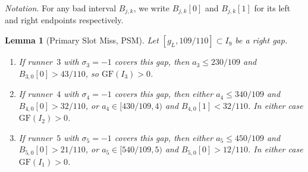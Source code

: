 \documentclass[12pt,a4paper]{amsart}
\newtheorem{lemma}[theorem]{Lemma}
\theoremstyle{definition}
\theoremstyle{remark}
\newcommand{\GF}{\mathrm{GF}}
\begin{document}
\noindent\textit{Notation.} For any bad interval $B_{j,k}$, we write $B_{j,k}[0]$ and
$B_{j,k}[1]$ for its left and right endpoints respectively.

\begin{lemma}[Primary Slot Miss, PSM]\label{lem:psm}
Let $[g_L,109/110]\subset I_9$ be a right gap.
\begin{enumerate}
  \item If runner~$3$ with $\sigma_3=-1$ covers this gap, then $a_3\le 230/109$ and
        $B_{3,0}[0]>43/110$, so $\GF(I_3)>0$.
  \item If runner~$4$ with $\sigma_4=-1$ covers this gap, then either $a_4\le 340/109$ and
        $B_{4,0}[0]>32/110$, or $a_4\in[430/109,4)$ and $B_{4,0}[1]<32/110$. In either
        case $\GF(I_2)>0$.
  \item If runner~$5$ with $\sigma_5=-1$ covers this gap, then either $a_5\le 450/109$ and
        $B_{5,0}[0]>21/110$, or $a_5\in[540/109,5)$ and $B_{5,0}[0]>12/110$. In either
        case $\GF(I_1)>0$.
\end{enumerate}
\end{lemma}
\end{document}
